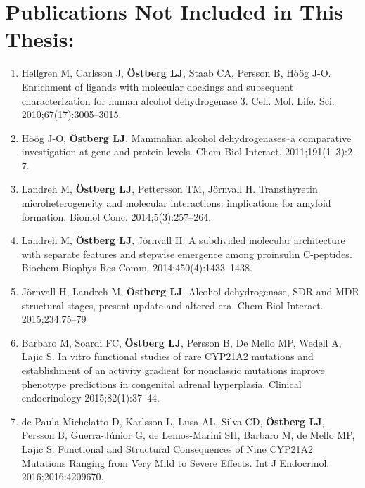 \documentclass[a4paper, twoside, 12pt, openright]{report}
\begin{document}
{\let\cleardoublepage\clearpage
\chapter*{Publications Not Included in This Thesis:}

\begin{enumerate}[label=(\Alph*)]
 \item Hellgren M, Carlsson J, {\bf Östberg LJ}, Staab CA, Persson B, Höög J-O. Enrichment of ligands with molecular dockings and subsequent characterization for human alcohol dehydrogenase 3. Cell. Mol. Life. Sci. 2010;67(17):3005--3015.
 \item Höög J-O, {\bf Östberg LJ}. Mammalian alcohol dehydrogenases--a comparative investigation at gene and protein levels. Chem Biol Interact. 2011;191(1--3):2--7.
 \item Landreh M, {\bf Östberg LJ}, Pettersson TM, Jörnvall H. Transthyretin microheterogeneity and molecular interactions: implications for amyloid formation. Biomol Conc. 2014;5(3):257--264.
 \item Landreh M, {\bf Östberg LJ}, Jörnvall H. A subdivided molecular architecture with separate features and stepwise emergence among proinsulin C-peptides. Biochem Biophys Res Comm. 2014;450(4):1433--1438.
 \item Jörnvall H, Landreh M, {\bf Östberg LJ}. Alcohol dehydrogenase, SDR and MDR structural stages, present update and altered era. Chem Biol Interact. 2015;234:75--79
 \item Barbaro M, Soardi FC, {\bf Östberg LJ}, Persson B, De Mello MP, Wedell A, Lajic S. In vitro functional studies of rare CYP21A2 mutations and establishment of an activity gradient for nonclassic mutations improve phenotype predictions in congenital adrenal hyperplasia. Clinical endocrinology 2015;82(1):37--44.
 \item de Paula Michelatto D, Karlsson L, Lusa AL, Silva CD, {\bf Östberg LJ}, Persson B, Guerra-Júnior G, de Lemos-Marini SH, Barbaro M, de Mello MP, Lajic S. Functional and Structural Consequences of Nine CYP21A2 Mutations Ranging from Very Mild to Severe Effects. Int J Endocrinol. 2016;2016:4209670.
\end{enumerate}

\thispagestyle{empty}
}
\newpage

\tableofcontents

\thispagestyle{empty}

{\let\cleardoublepage\clearpage
\printnomenclature
\thispagestyle{empty}
}
\end{document}
